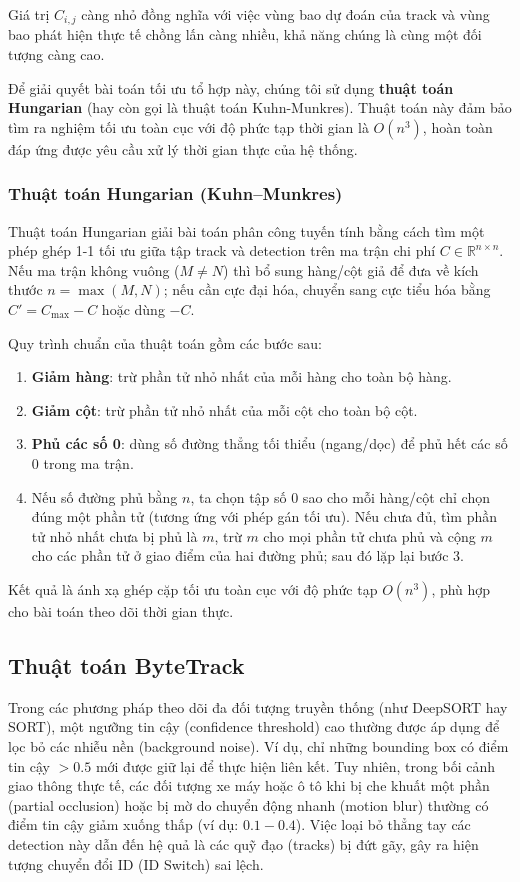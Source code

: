 Giá trị $C_{i,j}$ càng nhỏ đồng nghĩa với việc vùng bao dự đoán của track và vùng bao phát hiện thực tế chồng lấn càng nhiều, khả năng chúng là cùng một đối tượng càng cao.

Để giải quyết bài toán tối ưu tổ hợp này, chúng tôi sử dụng \textbf{thuật toán Hungarian} (hay còn gọi là thuật toán Kuhn-Munkres). Thuật toán này đảm bảo tìm ra nghiệm tối ưu toàn cục với độ phức tạp thời gian là $O(n^3)$, hoàn toàn đáp ứng được yêu cầu xử lý thời gian thực của hệ thống.



\subsubsection{Thuật toán Hungarian (Kuhn--Munkres)}
Thuật toán Hungarian giải bài toán phân công tuyến tính bằng cách tìm một phép ghép 1-1 tối ưu giữa tập track và detection trên ma trận chi phí $C \in \mathbb{R}^{n \times n}$. Nếu ma trận không vuông ($M \neq N$) thì bổ sung hàng/cột giả để đưa về kích thước $n = \max(M, N)$; nếu cần cực đại hóa, chuyển sang cực tiểu hóa bằng $C' = C_{\max} - C$ hoặc dùng $-C$. \cite{kuhn1955hungarian}

Quy trình chuẩn của thuật toán gồm các bước sau:
\begin{enumerate}
    \item \textbf{Giảm hàng}: trừ phần tử nhỏ nhất của mỗi hàng cho toàn bộ hàng.
    \item \textbf{Giảm cột}: trừ phần tử nhỏ nhất của mỗi cột cho toàn bộ cột.
    \item \textbf{Phủ các số 0}: dùng số đường thẳng tối thiểu (ngang/dọc) để phủ hết các số 0 trong ma trận.
    \item Nếu số đường phủ bằng $n$, ta chọn tập số 0 sao cho mỗi hàng/cột chỉ chọn đúng một phần tử (tương ứng với phép gán tối ưu). Nếu chưa đủ, tìm phần tử nhỏ nhất chưa bị phủ là $m$, trừ $m$ cho mọi phần tử chưa phủ và cộng $m$ cho các phần tử ở giao điểm của hai đường phủ; sau đó lặp lại bước 3.
\end{enumerate}

Kết quả là ánh xạ ghép cặp tối ưu toàn cục với độ phức tạp $O(n^3)$, phù hợp cho bài toán theo dõi thời gian thực.\subsection{Thuật toán ByteTrack}
Trong các phương pháp theo dõi đa đối tượng truyền thống (như DeepSORT hay SORT), một ngưỡng tin cậy (confidence threshold) cao thường được áp dụng để lọc bỏ các nhiễu nền (background noise). Ví dụ, chỉ những bounding box có điểm tin cậy $> 0.5$ mới được giữ lại để thực hiện liên kết. Tuy nhiên, trong bối cảnh giao thông thực tế, các đối tượng xe máy hoặc ô tô khi bị che khuất một phần (partial occlusion) hoặc bị mờ do chuyển động nhanh (motion blur) thường có điểm tin cậy giảm xuống thấp (ví dụ: $0.1 - 0.4$). Việc loại bỏ thẳng tay các detection này dẫn đến hệ quả là các quỹ đạo (tracks) bị đứt gãy, gây ra hiện tượng chuyển đổi ID (ID Switch) sai lệch.

